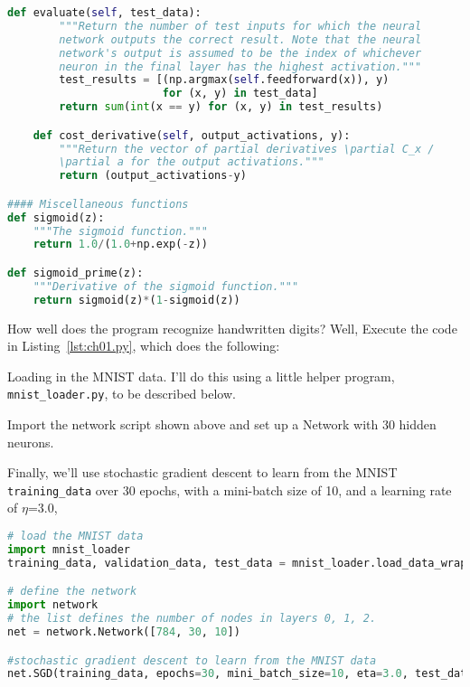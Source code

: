 \begin{fullwidth}
\begin{lstlisting}[caption={network.py (Python 2.7)},label={lst:network.py}, language=Python]
    def evaluate(self, test_data):
        """Return the number of test inputs for which the neural
        network outputs the correct result. Note that the neural
        network's output is assumed to be the index of whichever
        neuron in the final layer has the highest activation."""
        test_results = [(np.argmax(self.feedforward(x)), y)
                        for (x, y) in test_data]
        return sum(int(x == y) for (x, y) in test_results)

    def cost_derivative(self, output_activations, y):
        """Return the vector of partial derivatives \partial C_x /
        \partial a for the output activations."""
        return (output_activations-y)

#### Miscellaneous functions
def sigmoid(z):
    """The sigmoid function."""
    return 1.0/(1.0+np.exp(-z))

def sigmoid_prime(z):
    """Derivative of the sigmoid function."""
    return sigmoid(z)*(1-sigmoid(z))
\end{lstlisting}
\end{fullwidth}

How well does the program recognize handwritten digits? Well,  Execute the code in Listing~\ref{lst:ch01.py}, which does the following:


Loading in the MNIST data. I'll do this using a little helper program, \lstinline{mnist_loader.py}, to be described below.

Import the network script shown above and set up a Network with 30 hidden neurons.

Finally, we'll use stochastic gradient descent to learn from the MNIST \lstinline{training_data} over 30 epochs, with a mini-batch size of 10, and a learning rate of $\eta$=3.0, 

\begin{fullwidth}
\begin{lstlisting}[caption={ch01.py (Python 3.7.1)},label={lst:ch01.py}, language=Python]
# load the MNIST data
import mnist_loader
training_data, validation_data, test_data = mnist_loader.load_data_wrapper()

# define the network
import network
# the list defines the number of nodes in layers 0, 1, 2.
net = network.Network([784, 30, 10])

#stochastic gradient descent to learn from the MNIST data
net.SGD(training_data, epochs=30, mini_batch_size=10, eta=3.0, test_data=test_data)

\end{lstlisting}
\end{fullwidth}

